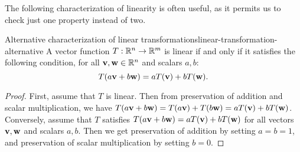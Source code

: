 The following characterization of linearity is often useful, as it
permits us to check just one property instead of two.

\begin{proposition}{Alternative characterization of linear transformations}{linear-transformation-alternative}
  A vector function $T:\mathbb{R}^{n}\to \mathbb{R}^{m}$ is linear if and only if it
  satisfies the following condition, for all
  $\vect{v},\vect{w}\in\R^n$ and scalars $a,b$:
  \begin{equation*}
    T(a\vect{v}+b\vect{w}) = aT(\vect{v}) + bT(\vect{w}).
  \end{equation*}
\end{proposition}

\begin{proof}
  First, assume that $T$ is linear. Then from preservation of addition
  and scalar multiplication, we have
  $T(a\vect{v}+b\vect{w}) = T(a\vect{v})+T(b\vect{w}) = aT(\vect{v}) +
  bT(\vect{w})$. Conversely, assume that $T$ satisfies
  $T(a\vect{v}+b\vect{w}) = aT(\vect{v}) + bT(\vect{w})$ for all
  vectors $\vect{v},\vect{w}$ and scalars $a,b$. Then we get
  preservation of addition by setting $a=b=1$, and preservation of
  scalar multiplication by setting $b=0$.
\end{proof}
